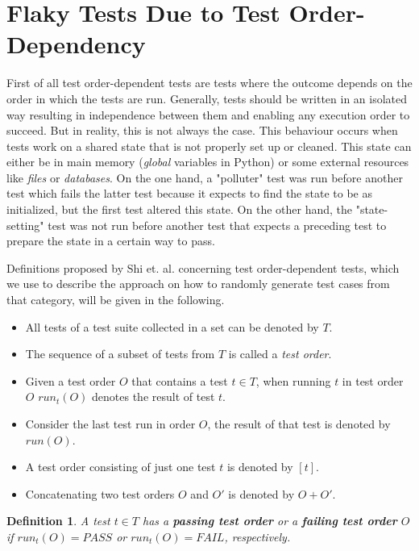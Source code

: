 \documentclass[
fancyheadings, %
%
%
]{stsreprt}
\newtheorem{definition}{Definition}
\begin{document}
\section{Flaky Tests Due to Test Order-Dependency}\label{sec:theory_order_dep}
First of all test order-dependent tests are tests where the outcome depends on the order in which the tests are run. 
Generally, tests should be written in an isolated way resulting in independence between them and enabling any execution order to succeed. 
But in reality, this is not always the case. This behaviour occurs when tests work on a shared state that is not properly set up or cleaned. 
This state can either be in main memory (\textit{global} variables in Python) or some external resources like \textit{files} or \textit{databases}. 
On the one hand, a "polluter" test was run before another test which fails the latter test because it expects to find the state to be as initialized, but the first test altered this state. 
On the other hand, the "state-setting" test was not run before another test that expects a preceding test to prepare the state in a certain way to pass. \par 
Definitions proposed by Shi et. al. \cite{ifixflakies:2019} concerning test order-dependent tests, which we use to describe the approach on how to randomly generate test cases from that category, will be given in the following. 


\begin{itemize}
\item All tests of a test suite collected in a set can be denoted by $T$.
\item The sequence of a subset of tests from $T$ is called a \textit{test order}.
\item Given a test order $O$ that contains a test $t \in T$, when running $t$ in test order $O$ $run_t(O)$ denotes the result of test $t$.
\item Consider the last test run in order $O$, the result of that test is denoted by $run(O)$.
\item A test order consisting of just one test $t$ is denoted by $[t]$.
\item Concatenating two test orders $O$ and $O'$ is denoted by $O + O'$. 
\end{itemize}

\begin{definition}
    A test $t \in T$ has a \textbf{passing test order} or a \textbf{failing test order} $O$ if $run_t(O) = PASS$ or $run_t(O) = FAIL$, respectively.
\end{definition}
\end{document}
